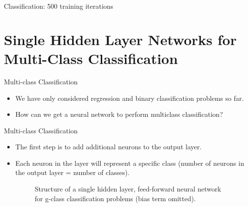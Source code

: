\begin{frame}{Classification: 500 training iterations}
{}

\end{frame}
% 

\section{Single Hidden Layer Networks for Multi-Class Classification}

\begin{frame} {Multi-class Classification}
  \vspace{20mm}
  \begin{itemize}
    \item We have only considered regression and binary classification problems so far.
    \vspace{5mm}
    \item How can we get a neural network to perform multiclass classification?
  \end{itemize}
\end{frame}

\begin{frame} {Multi-class Classification}
  \begin{itemize}
    \item The first step is to add additional neurons to the output layer.
    \item Each neuron in the layer will represent a specific class (number of neurons in the output layer = number of classes).
    \begin{figure}
      \centering
        \caption{\footnotesize Structure of a single hidden layer, feed-forward neural network for g-class classification problems (bias term omitted).}
    \end{figure}
  \end{itemize}
\end{frame}


